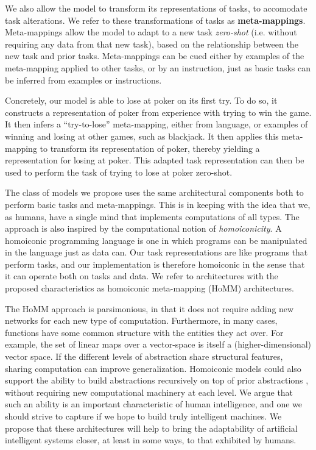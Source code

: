 We also allow the model to transform its representations of tasks, to accomodate task alterations. We refer to these transformations of tasks as \textbf{meta-mappings}. Meta-mappings allow the model to adapt to a new task \emph{zero-shot} (i.e. without requiring any data from that new task), based on the relationship between the new task and prior tasks. Meta-mappings can be cued either by examples of the meta-mapping applied to other tasks, or by an instruction, just as basic tasks can be inferred from examples or instructions. 

Concretely, our model is able to lose at poker on its first try. To do so, it constructs a representation of poker from experience with trying to win the game. It then infers a ``try-to-lose'' meta-mapping, either from language, or examples of winning and losing at other games, such as blackjack. It then applies this meta-mapping to transform its representation of poker, thereby yielding a representation for losing at poker. This adapted task representation can then be used to perform the task of trying to lose at poker zero-shot.

The class of models we propose uses the same architectural components both to perform basic tasks and meta-mappings.
This is in keeping with the idea that we, as humans, have a single mind that implements computations of all types. The approach is also inspired by the computational notion of \emph{homoiconicity}. A homoiconic programming  language is one in which programs can be manipulated in  the language just as data can. Our task representations are like programs that perform tasks, and our implementation is therefore homoiconic in the sense that it can operate both on tasks and data. We refer to architectures with the proposed characteristics as homoiconic meta-mapping (HoMM) architectures. 

The HoMM approach is parsimonious, in that it does not require adding new networks for each new type of computation. 
Furthermore, in many cases, functions have some common structure with the entities they act over. For example, the set of linear maps over a vector-space is itself a (higher-dimensional) vector space. If the different levels of abstraction share structural features, sharing computation can improve generalization. Homoiconic models could also support the ability to build abstractions recursively on top of prior abstractions \citep{Wilensky1991, Hazzan1999, Lampinen2017b}, without requiring new computational machinery at each level. We argue that such an ability is an important characteristic of human intelligence, and one we should strive to capture if we hope to build truly intelligent machines. We propose that these architectures will help to bring the adaptability of artificial intelligent systems closer, at least in some ways, to that exhibited by humans.

